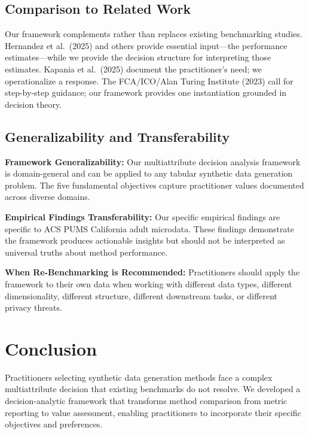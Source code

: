 \documentclass[12pt,a4paper]{article}
\begin{document}
\subsection{Comparison to Related Work}

Our framework complements rather than replaces existing benchmarking studies. Hernandez et al.\ (2025) and others provide essential input---the performance estimates---while we provide the decision structure for interpreting those estimates. Kapania et al.\ (2025) document the practitioner's need; we operationalize a response. The FCA/ICO/Alan Turing Institute (2023) call for step-by-step guidance; our framework provides one instantiation grounded in decision theory.

\subsection{Generalizability and Transferability}

\textbf{Framework Generalizability:} Our multiattribute decision analysis framework is domain-general and can be applied to any tabular synthetic data generation problem. The five fundamental objectives capture practitioner values documented across diverse domains.

\textbf{Empirical Findings Transferability:} Our specific empirical findings are specific to ACS PUMS California adult microdata. These findings demonstrate the framework produces actionable insights but should not be interpreted as universal truths about method performance.

\textbf{When Re-Benchmarking is Recommended:} Practitioners should apply the framework to their own data when working with different data types, different dimensionality, different structure, different downstream tasks, or different privacy threats.

\section{Conclusion}

Practitioners selecting synthetic data generation methods face a complex multiattribute decision that existing benchmarks do not resolve. We developed a decision-analytic framework that transforms method comparison from metric reporting to value assessment, enabling practitioners to incorporate their specific objectives and preferences.
\end{document}
